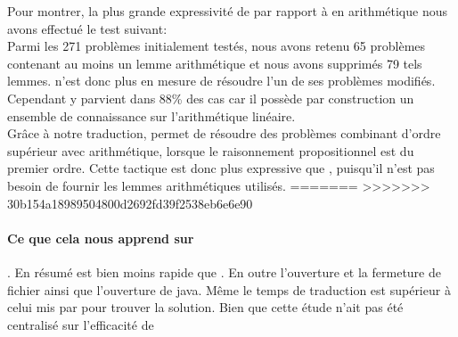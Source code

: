 Pour montrer, la plus grande expressivité de \beagletac par rapport à \metistac en arithmétique nous avons effectué le test suivant:
\\Parmi les 271 problèmes initialement testés, nous avons retenu 65 problèmes contenant au moins un lemme arithmétique et nous avons supprimés 79 tels lemmes. \metistac n'est donc plus en mesure de résoudre l'un de ses problèmes modifiés. Cependant \beagletac y parvient dans 88\% des cas car il possède par construction un ensemble de connaissance sur l'arithmétique linéaire.
\\Grâce à notre traduction, \beagletac permet de résoudre des problèmes
combinant d'ordre supérieur avec arithmétique, lorsque le raisonnement
propositionnel est du premier ordre. Cette tactique est donc plus
expressive que \metistac, puisqu'il n'est pas besoin de fournir les
lemmes arithmétiques utilisés.
=======
>>>>>>> 30b154a18989504800d2692fd39f2538eb6e6e90





\paragraph {Ce que cela nous apprend sur \beagletac}.
En résumé \beagletac est bien moins rapide que \metistac. En outre l'ouverture et la fermeture de fichier ainsi que l'ouverture de java. Même le temps de traduction est supérieur à celui mis par \metistac pour trouver la solution. Bien que cette étude n'ait pas été centralisé sur l'efficacité de \beagle
